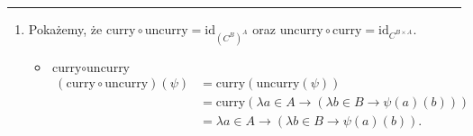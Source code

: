 \documentclass[11pt,a4paper]{article}
\begin{document}
\bigskip
\hrule
\bigskip

\begin{enumerate}
    \item Pokażemy, że \( \text{curry} \circ \text{uncurry} = \text{id}_{(C^B)^A} \) oraz \( \text{uncurry} \circ \text{curry} = \text{id}_{C^{B \times A}} \).
        \begin{itemize}
            \item \( \text{curry} \circ \text{uncurry} \)
                \begin{equation}
                    \begin{aligned}
                        (\text{curry} \circ \text{uncurry})(\psi)
                        &= \text{curry}(\text{uncurry}(\psi)) \\
                        &= \text{curry}(\lambda a \in A \to (\lambda b \in B \to \psi(a)(b))) \\
                        &= \lambda a \in A \to (\lambda b \in B \to \psi(a)(b)).
                    \end{aligned}
                \end{equation}


\end{itemize}
\end{enumerate}
\end{document}
